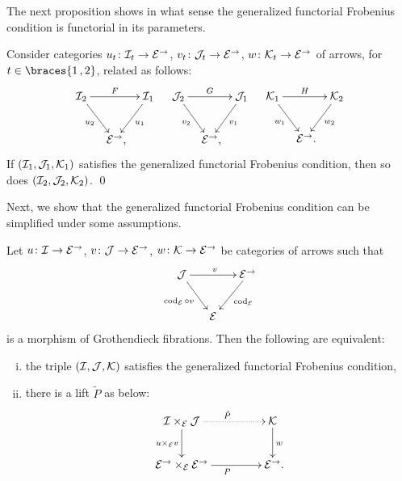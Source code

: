 \documentclass[reqno,10pt,a4paper,oneside,draft]{amsart}
\begin{document}
{{The next proposition shows in what sense the generalized functorial Frobenius condition is functorial in its parameters.

\begin{proposition} \label{generalized-uniform-frob-functorial}
Consider categories $u_t \co \cal{I}_t \to \cal{E}^\to$, $v_t \co \cal{J}_t \to \cal{E}^\to$, $w \co \cal{K}_t \to \cal{E}^\to$ of arrows, for $t \in \braces{1\,, 2}$, related as follows:
\begin{align*}
\xymatrix@!C@C-1.5em{
  \cal{I}_2
  \ar[rr]^{F}
  \ar[dr]_{u_2}
&&
  \cal{I}_1
  \ar[dl]^{u_1}
\\&
  \catE^\to
\rlap{,}}
&&
\xymatrix@C-1.5em{
  \cal{J}_2
  \ar[rr]^-{G}
  \ar[dr]_{v_2}
&&
  \cal{J}_1
  \ar[dl]^{v_1}
\\&
  \catE^\to
\rlap{,}}
&&
\xymatrix@C-1.5em{
  \cal{K}_1
  \ar[rr]^-{H}
  \ar[dr]_{w_1}
&&
  \cal{K}_2
  \ar[dl]^{w_2}
\\&
  \catE^\to
\rlap{.}}
\end{align*}
If $(\cal{I}_1, \cal{J}_1, \cal{K}_1)$ satisfies the generalized functorial Frobenius condition, then so does $(\cal{I}_2, \cal{J}_2, \cal{K}_2)$.
\qed
\end{proposition}

Next, we show that the generalized functorial Frobenius condition can be simplified under some assumptions.

\begin{proposition} \label{generalized-uniform-frob-nicer}
Let $u \co \cal{I} \to \cal{E}^\to$, $v \co \cal{J} \to \cal{E}^\to$, $w \co \cal{K} \to \cal{E}^\to$ be categories of arrows such that
\begin{equation} \label{uniform-frob:comprehension}
\begin{gathered}
\xymatrix@C-1em{
  \cal{J}
  \ar[rr]^{v}
  \ar[dr]_{\cod_{\cal{E}} \cc v}
&&
  \cal{E}^\to
  \ar[dl]^{\cod_{\cal{E}}}
\\&
  \cal{E}
}
\end{gathered}
\end{equation}
is a morphism of Grothendieck fibrations.
Then the following are equivalent:
\begin{enumerate}[(i)]
\item the triple $(\cal{I}, \cal{J}, \cal{K})$ satisfies the generalized functorial Frobenius condition,
\item there is a lift $\tilde{P}$ as below:
\begin{equation} \label{generalized-uniform-frob-nicer:lift}
\begin{gathered}
\xymatrix@C+2em{
  \cal{I} \times_{\cal{E}} \cal{J}
  \ar@{.>}[r]^{\tilde{P}}
  \ar[d]_{u \times_{\cal{E}} v}
&
  \cal{K}
  \ar[d]^{w}
\\
  \cal{E}^\to \times_{\cal{E}} \cal{E}^\to
  \ar[r]_{P}
&
  \cal{E}^\to
\rlap{.}}
\end{gathered}
\end{equation}
\end{enumerate}
\end{proposition}

}}
\end{document}
